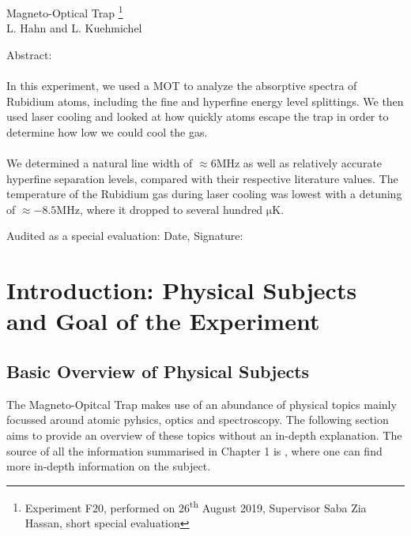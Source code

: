 \documentclass[12pt, a4paper]{article}
\begin{document}
\thispagestyle{empty}     %
\null\vspace{40mm}
\begin{center}
{%
\Large  Magneto-Optical Trap
\footnote{\noindent Experiment F20, performed on 26\textsuperscript{th} August 2019,
Supervisor Saba Zia Hassan,
short special evaluation}
}\\[15mm]
L. Hahn and L. Kuehmichel

\vspace{25mm}

\parbox{0.9\textwidth}{
Abstract:\\\\   
\small In this experiment, we used a MOT to analyze the absorptive spectra of Rubidium atoms, including the fine and hyperfine energy level splittings. We then used laser cooling and looked at how quickly atoms escape the trap in order to determine how low we could cool the gas.
\\\\
We determined a natural line width of $\approx 6 \si{\mega\hertz}$ as well as relatively accurate hyperfine separation levels, compared with their respective literature values. The temperature of the Rubidium gas during laser cooling was lowest with a detuning of $\approx -8.5 \si{\mega\hertz}$, where it dropped to several hundred $\si{\micro\kelvin}$.
}
\end{center}

\vfill
Audited as a special evaluation: Date, Signature:
\vspace{20mm}

\null\thispagestyle{empty} 
   

\newpage

\section{Introduction: Physical Subjects and Goal of the Experiment}
\subsection{Basic Overview of Physical Subjects}
The Magneto-Opitcal Trap makes use of an abundance of physical topics mainly focussed around atomic pyhsics, optics and spectroscopy. The following section aims to provide an overview of these topics without an in-depth explanation. The source of all the information summarised in Chapter 1 is \cite{script}, where one can find more in-depth information on the subject.
\end{document}
